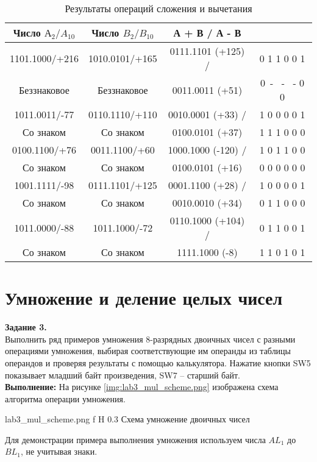\documentclass{bmstu}
\begin{document}
\begin{table}[H]
\caption{Результаты операций сложения и вычетания}
\label{table:sub_table}
\begin{tabular}{| c | c | c | c |}
	\hline
		Число $ \text{А}_2 / A_{10}$ & Число $ B_2/B_{10}$ & А + В / А - В & \text{Признаки: H S V N Z C} \\	
	\hline
		1101.1000/+216 & 1010.0101/+165 & 0111.1101 (+125) / & 0 1  1 0  0 1 \\
		Беззнаковое & Беззнаковое & 0011.0011 (+51) & 0~- ~- ~- 0 0 \\
	\hline
		1011.0011/-77 & 0110.1110/+110 & 0010.0001 (+33) / & 1 0  0 0  0 1 \\
		Со знаком & Со знаком & 0100.0101 (+37) & 1 1  1 0  0 0 \\
	\hline
		0100.1100/+76 & 0011.1100/+60 & 1000.1000 (-120) /  & 1 0  1 1  0 0 \\
		Со знаком & Со знаком & 0100.0101 (+16) & 0 0  0 0  0 0 \\
	\hline
		1001.1111/-98 & 0111.1101/+125 & 0001.1100 (+28) / &  1 0 0 0 0 1\\
		Со знаком & Со знаком & 0010.0010 (+34) & 0 1  1 0  0 0 \\
	\hline
		1011.0000/-88 & 1011.1000/-72 & 0110.1000 (+104) / & 0 1  1 0  0 1 \\
		Со знаком & Со знаком & 1111.1000 (-8) & 1 1  0 1  0 1 \\
	\hline
\end{tabular}
\end{table}

\chapter{Умножение и деление целых чисел}
\textbf{Задание 3.} \\
Выполнить ряд примеров умножения 8-разрядных двоичных чисел с разными операциями умножения, выбирая 
соответствующие им операнды из таблицы операндов и проверяя результаты с помощью калькулятора. Нажатие кнопки SW5 
показывает младший байт произведения, SW7 – старший байт.
\\
\textbf{Выполнение:}
На рисунке \ref{img:lab3_mul_scheme.png} изображена схема алгоритма операции умножения.

	{lab3_mul_scheme.png}
	{f}
	{H}
	{0.3\textwidth}
	{Схема умножение двоичных чисел}

Для демонстрации примера выполнения умножения используем числа $AL_1$ до $BL_1$, не учитывая знаки.
\end{document}

